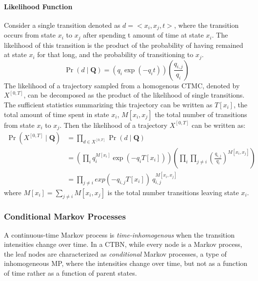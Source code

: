 \paragraph*{Likelihood Function}
\label{sec:llh_of_homo}
Consider a single transition denoted as $ d = <x_{i},x_{j},t> $, where the transition occurs from state $ x_{i} $ to $ x_{j} $ after spending t amount of time at state $ x_{i} $. The likelihood of this transition is the product of the probability of having remained at state $ x_{i} $ for that long, and the probability of transitioning to $ x_{j} $.
\begin{equation}
\operatorname{Pr}(d  \mid \textbf{Q}) = \left( q_{i}\exp(-q_{i}t) \right) \left( \frac{q_{i,j}}{q_{i}} \right)
\end{equation}
The likelihood of a trajectory sampled from a homogenous CTMC, denoted by $ X^{[0,T]} $, can be decomposed as the product of the likelihood of single transitions. The sufficient statistics summarizing this trajectory can be written as $ T[x_{i}] $, the total amount of time spent in state $ x_{i} $, $ M[x_{i}, x_{j}] $ the total number of transitions from state $ x_{i} $ to $ x_{j} $. Then the likelihood of a trajectory $  X^{\left[0,T\right] } $ can be written as:
\begin{align}
\operatorname{Pr}(X^{[0,T]}  \mid \textbf{Q}) &=  \prod_{d \in X^{[0,T]}} \operatorname{Pr}(d \mid \textbf{Q}) \nonumber\\&=\left(\prod_{ i} q_{i}^{M[x_{i}]} \exp \left(-q_{i} T[x_{i}]\right)\right)\left(\prod_{ i} \prod_{ j \neq i} \left(\frac{q_{i,j}}{q_{i}}\right)^{M\left[x_{i}, x_{j}\right]}\right) \nonumber\\ & = \prod_{j \neq i}  exp(-q_{i,j}T[x_{i}])\ q_{i,j}^{M[x_{i},x_{j}]}
\label{eq:lh_traj_homo}
\end{align}
where $ M[x_{i}] = \sum_{j \neq i} M[x_{i}, x_{j}] $ is the total number transitions leaving state $ x_{i} $.


\subsubsection{Conditional Markov Processes}
A continuous-time Markov process is \textit{time-inhomogenous} when the transition intensities change over time. In a CTBN, while every node is a Markov process, the leaf nodes are characterized as \textit{conditional} Markov processes, a type of inhomogeneous MP, where the intensities change over time, but not as a function of time rather as a function of parent states. \cite{Nodelman1995} 

